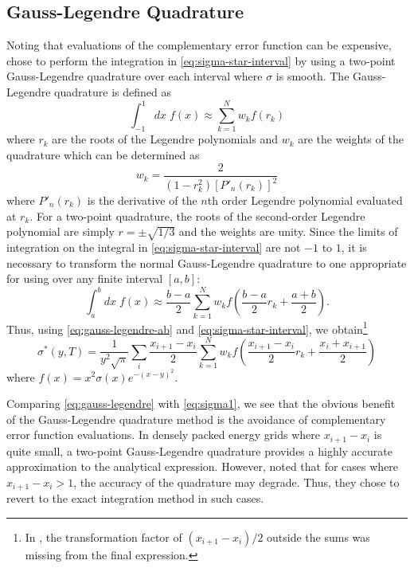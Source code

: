 \documentclass[3p,authoryear]{elsarticle}
\begin{document}
\subsection{Gauss-Legendre Quadrature}

Noting that evaluations of the complementary error function can be expensive,
\citet{physor-li-2012} chose to perform the integration in
\autoref{eq:sigma-star-interval} by using a two-point Gauss-Legendre quadrature
over each interval where $\sigma$ is smooth. The Gauss-Legendre quadrature is
defined as
\begin{equation}
  \int_{-1}^1 dx \; f(x) \approx \sum_{k=1}^N w_k f(r_k)
\end{equation}
where $r_k$ are the roots of the Legendre polynomials and $w_k$ are the weights
of the quadrature which can be determined as
\begin{equation}
  w_k = \frac{2}{\left ( 1 - r_k^2 \right ) \left [ P'_n (r_k) \right ]^2}
\end{equation}
where $P'_n(r_k)$ is the derivative of the $n$th order Legendre polynomial
evaluated at $r_k$.  For a two-point quadrature, the roots of the second-order
Legendre polynomial are simply $r = \pm \sqrt{1/3}$ and the weights are
unity. Since the limits of integration on the integral in
\autoref{eq:sigma-star-interval} are not $-1$ to $1$, it is necessary to
transform the normal Gauss-Legendre quadrature to one appropriate for using over
any finite interval $[a,b]$:
\begin{equation}
  \label{eq:gauss-legendre-ab}
  \int_{a}^b dx \; f(x) \approx \frac{b-a}{2} \sum_{k=1}^N w_k f\left(
  \frac{b-a}{2} r_k + \frac{a+b}{2} \right).
\end{equation}
Thus, using \autoref{eq:gauss-legendre-ab} and \autoref{eq:sigma-star-interval},
we obtain\footnote{In \citet{physor-li-2012}, the transformation factor of
  $(x_{i+1} - x_i)/2$ outside the sums was missing from the final expression.}
\begin{equation}
  \label{eq:gauss-legendre}
  \sigma^* (y,T) = \frac{1}{y^2\sqrt{\pi}} \sum_i \frac{x_{i+1} - x_i}{2}
  \sum_{k=1}^N w_k f \left ( \frac{x_{i+1} - x_i}{2} r_k + \frac{x_i +
    x_{i+1}}{2} \right )
\end{equation}
where $f(x) = x^2 \sigma(x) e^{-(x-y)^2}$.

Comparing \autoref{eq:gauss-legendre} with \autoref{eq:sigma1}, we see that the
obvious benefit of the Gauss-Legendre quadrature method is the avoidance of
complementary error function evaluations. In densely packed energy grids where
$x_{i+1} - x_i$ is quite small, a two-point Gauss-Legendre quadrature provides a
highly accurate approximation to the analytical expression. However,
\citet{physor-li-2012} noted that for cases where $x_{i+1} - x_i > 1$, the
accuracy of the quadrature may degrade. Thus, they chose to revert to the exact
integration method in such cases.
\end{document}
